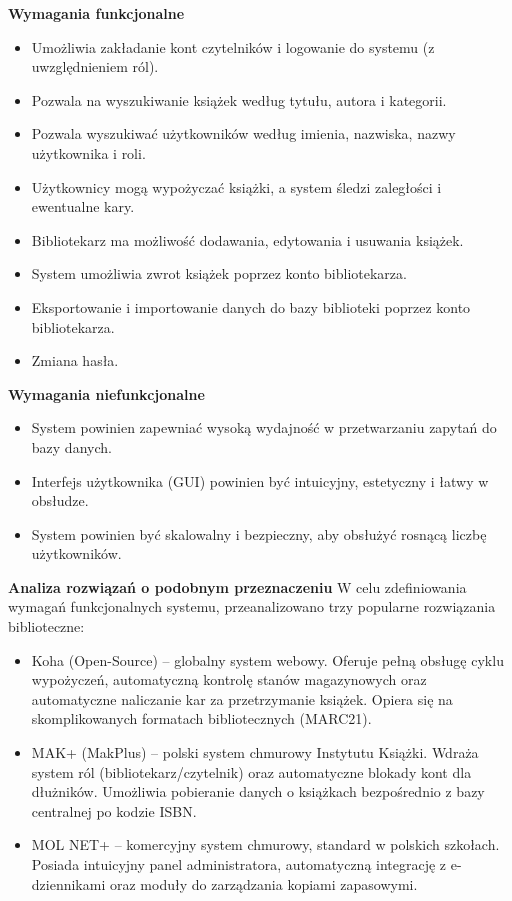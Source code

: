 \noindent \textbf{Wymagania funkcjonalne}
\begin{itemize}
    \item Umożliwia zakładanie kont czytelników i logowanie do systemu (z uwzględnieniem ról).
    \item Pozwala na wyszukiwanie książek według tytułu, autora i kategorii.
    \item Pozwala wyszukiwać użytkowników według imienia, nazwiska, nazwy użytkownika i roli.
    \item Użytkownicy mogą wypożyczać książki, a system śledzi zaległości i ewentualne kary. 
    \item Bibliotekarz ma możliwość dodawania, edytowania i usuwania książek. 
    \item System umożliwia zwrot książek poprzez konto bibliotekarza.
    \item Eksportowanie i importowanie danych do bazy biblioteki poprzez konto bibliotekarza.
    \item Zmiana hasła.
\end{itemize}

\noindent \textbf{Wymagania niefunkcjonalne}
\begin{itemize}
    \item System powinien zapewniać wysoką wydajność w przetwarzaniu zapytań do bazy danych.     
    \item Interfejs użytkownika (GUI) powinien być intuicyjny, estetyczny i łatwy w obsłudze.
    \item System powinien być skalowalny i bezpieczny, aby obsłużyć rosnącą liczbę użytkowników.
\end{itemize}

\noindent \textbf{Analiza rozwiązań o podobnym przeznaczeniu}
\bigskip
W celu zdefiniowania wymagań funkcjonalnych systemu, przeanalizowano trzy popularne rozwiązania biblioteczne:
\begin{itemize}
    \item Koha (Open-Source) \cite{Koha} – globalny system webowy. Oferuje pełną obsługę cyklu wypożyczeń, automatyczną kontrolę stanów magazynowych oraz automatyczne naliczanie kar za przetrzymanie książek. Opiera się na skomplikowanych formatach bibliotecznych (MARC21).
    \item MAK+ (MakPlus) \cite{MAK+} – polski system chmurowy Instytutu Książki. Wdraża system ról (bibliotekarz/czytelnik) oraz automatyczne blokady kont dla dłużników. Umożliwia pobieranie danych o książkach bezpośrednio z bazy centralnej po kodzie ISBN.
    \item MOL NET+ \cite{MOLNET+} – komercyjny system chmurowy, standard w polskich szkołach. Posiada intuicyjny panel administratora, automatyczną integrację z e-dziennikami oraz moduły do zarządzania kopiami zapasowymi.
\end{itemize}


